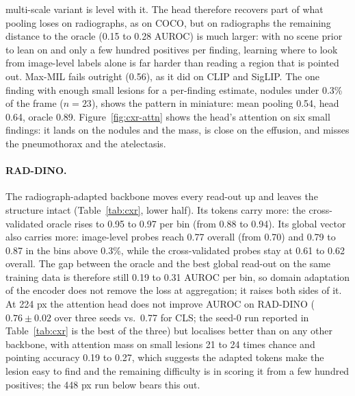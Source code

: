 \documentclass[10pt,letterpaper,twocolumn]{article}
\begin{document}
multi-scale variant is level with it. The head therefore recovers part of what pooling loses
on radiographs, as on COCO, but on radiographs the remaining distance to the oracle (0.15 to
0.28 AUROC) is much larger: with no scene prior to lean on and only a few hundred positives
per finding, learning where to look from image-level labels alone is far harder than reading
a region that is pointed out. Max-MIL fails outright (0.56), as it did on CLIP and SigLIP.
The one finding with enough small lesions for a per-finding estimate, nodules under 0.3\% of
the frame ($n=23$), shows the pattern in miniature: mean pooling 0.54, head 0.64, oracle 0.89.
Figure~\ref{fig:cxr-attn} shows the head's attention on six small findings: it lands on the
nodules and the mass, is close on the effusion, and misses the pneumothorax and the
atelectasis.

\paragraph{RAD-DINO.}
The radiograph-adapted backbone moves every read-out up and leaves the structure intact
(Table~\ref{tab:cxr}, lower half). Its tokens carry more: the cross-validated oracle rises to
0.95 to 0.97 per bin (from 0.88 to 0.94). Its global vector also carries more: image-level
probes reach 0.77 overall (from 0.70) and 0.79 to 0.87 in the bins above 0.3\%, while the
cross-validated probes stay at 0.61 to 0.62 overall. The gap between the oracle and the best
global read-out on the same training data is therefore still 0.19 to 0.31 AUROC per bin, so
domain adaptation of the encoder does not remove the loss at aggregation; it raises both
sides of it. At 224 px the attention head does not improve AUROC on RAD-DINO ($0.76\pm0.02$ over three seeds vs.\ 0.77 for CLS; the seed-0 run reported in Table~\ref{tab:cxr} is the best of the three) but localises better than on any other backbone, with attention mass on small lesions 21 to 24
times chance and pointing accuracy 0.19 to 0.27, which suggests the adapted tokens make the
lesion easy to find and the remaining difficulty is in scoring it from a few hundred positives;
the 448 px run below bears this out.
\end{document}

